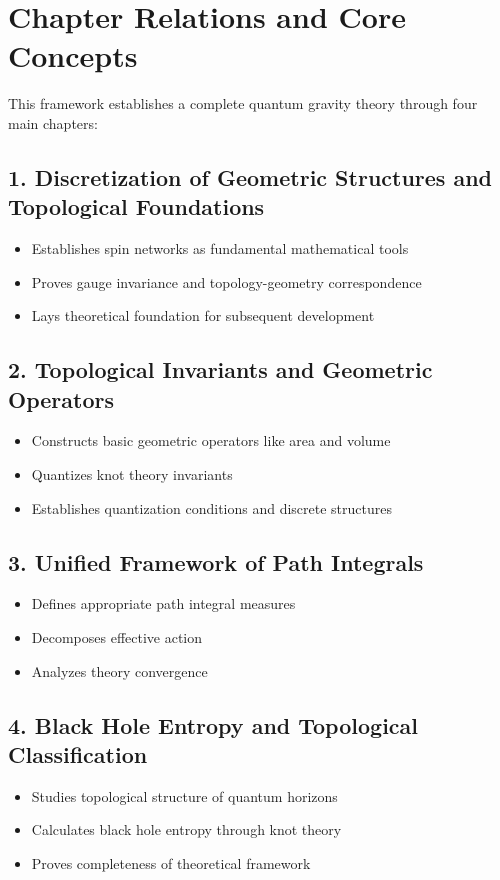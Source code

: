 \documentclass[12pt,a4paper]{article}
\begin{document}
\section*{Chapter Relations and Core Concepts}

This framework establishes a complete quantum gravity theory through four main chapters:

\subsection*{1. Discretization of Geometric Structures and Topological Foundations}
\begin{itemize}
\item Establishes spin networks as fundamental mathematical tools
\item Proves gauge invariance and topology-geometry correspondence
\item Lays theoretical foundation for subsequent development
\end{itemize}

\subsection*{2. Topological Invariants and Geometric Operators}
\begin{itemize}
\item Constructs basic geometric operators like area and volume
\item Quantizes knot theory invariants
\item Establishes quantization conditions and discrete structures
\end{itemize}

\subsection*{3. Unified Framework of Path Integrals}
\begin{itemize}
\item Defines appropriate path integral measures
\item Decomposes effective action
\item Analyzes theory convergence
\end{itemize}

\subsection*{4. Black Hole Entropy and Topological Classification}
\begin{itemize}
\item Studies topological structure of quantum horizons
\item Calculates black hole entropy through knot theory
\item Proves completeness of theoretical framework
\end{itemize}
\end{document}

